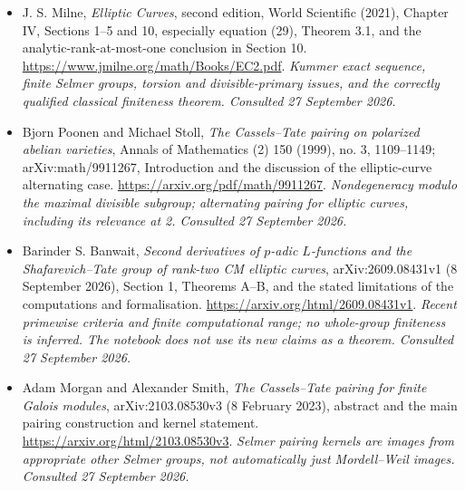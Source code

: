 \documentclass[11pt,a4paper]{article}
\numberwithin{equation}{section}
\begin{document}
\begin{itemize}
\item[\textnormal{[E1]}]\hypertarget{extra:statement:1}{} J. S. Milne, \emph{Elliptic Curves}, second edition, World Scientific (2021), Chapter IV, Sections 1--5 and 10, especially equation (29), Theorem 3.1, and the analytic-rank-at-most-one conclusion in Section 10.
\url{https://www.jmilne.org/math/Books/EC2.pdf}.
{\small\textit{Kummer exact sequence, finite Selmer groups, torsion and divisible-primary issues, and the correctly qualified classical finiteness theorem. Consulted 27 September 2026.}}
\item[\textnormal{[E2]}]\hypertarget{extra:statement:2}{} Bjorn Poonen and Michael Stoll, \emph{The Cassels--Tate pairing on polarized abelian varieties}, Annals of Mathematics (2) 150 (1999), no. 3, 1109--1149; arXiv:math/9911267, Introduction and the discussion of the elliptic-curve alternating case.
\url{https://arxiv.org/pdf/math/9911267}.
{\small\textit{Nondegeneracy modulo the maximal divisible subgroup; alternating pairing for elliptic curves, including its relevance at 2. Consulted 27 September 2026.}}
\item[\textnormal{[E3]}]\hypertarget{extra:statement:3}{} Barinder S. Banwait, \emph{Second derivatives of $p$-adic $L$-functions and the Shafarevich--Tate group of rank-two CM elliptic curves}, arXiv:2609.08431v1 (8 September 2026), Section 1, Theorems A--B, and the stated limitations of the computations and formalisation.
\url{https://arxiv.org/html/2609.08431v1}.
{\small\textit{Recent primewise criteria and finite computational range; no whole-group finiteness is inferred. The notebook does not use its new claims as a theorem. Consulted 27 September 2026.}}
\item[\textnormal{[E4]}]\hypertarget{extra:statement:4}{} Adam Morgan and Alexander Smith, \emph{The Cassels--Tate pairing for finite Galois modules}, arXiv:2103.08530v3 (8 February 2023), abstract and the main pairing construction and kernel statement.
\url{https://arxiv.org/html/2103.08530v3}.
{\small\textit{Selmer pairing kernels are images from appropriate other Selmer groups, not automatically just Mordell--Weil images. Consulted 27 September 2026.}}
\end{itemize}
\end{document}
